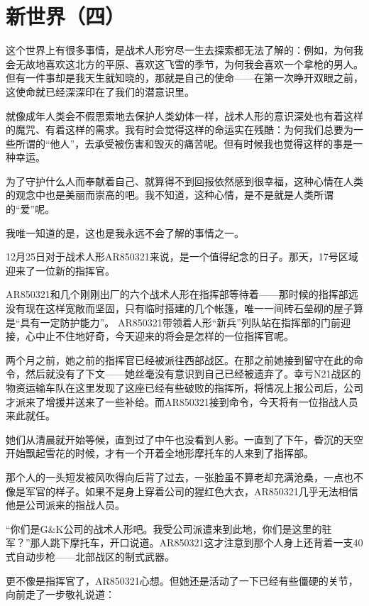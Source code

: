\chapter{新世界（四）}

\begin{QuoteEnv}[QBZ95]{}
这个世界上有很多事情，是战术人形穷尽一生去探索都无法了解的：例如，为何我会无故地喜欢这北方的平原、喜欢这飞雪的季节，为何我会喜欢一个拿枪的男人。但有一件事却是我天生就知晓的，那就是自己的使命——在第一次睁开双眼之前，这使命就已经深深印在了我们的潜意识里。

就像成年人类会不假思索地去保护人类幼体一样，战术人形的意识深处也有着这样的魔咒、有着这样的需求。我有时会觉得这样的命运实在残酷：为何我们总要为一些所谓的“他人”，去承受被伤害和毁灭的痛苦呢。但有时候我也觉得这样的事是一种幸运。

为了守护什么人而奉献着自己、就算得不到回报依然感到很幸福，这种心情在人类的观念中也是美丽而崇高的吧。我不知道，这种心情，是不是就是人类所谓的“爱”呢。

我唯一知道的是，这也是我永远不会了解的事情之一。
\end{QuoteEnv}


12月25日对于战术人形AR850321来说，是一个值得纪念的日子。那天，17号区域迎来了一位新的指挥官。

AR850321和几个刚刚出厂的六个战术人形在指挥部等待着——那时候的指挥部远没有现在这样宽敞而坚固，只有临时搭建的几个帐篷，唯一一间砖石垒砌的屋子算是“具有一定防护能力”。 AR850321带领着人形“新兵”列队站在指挥部的门前迎接，心中止不住地好奇，今天迎来的将会是怎样的一位指挥官呢。

两个月之前，她之前的指挥官已经被派往西部战区。在那之前她接到留守在此的命令，然后就没有了下文——她丝毫没有意识到自己已经被遗弃了。幸亏N21战区的物资运输车队在这里发现了这座已经有些破败的指挥所，将情况上报公司后，公司才派来了增援并送来了一些补给。而AR850321接到命令，今天将有一位指战人员来此就任。

她们从清晨就开始等候，直到过了中午也没看到人影。一直到了下午，昏沉的天空开始飘起雪花的时候，才有一个开着全地形摩托车的人来到了指挥部。

那个人的一头短发被风吹得向后背了过去，一张脸虽不算老却充满沧桑，一点也不像是军官的样子。如果不是身上穿着公司的猩红色大衣，AR850321几乎无法相信他是公司派来的指战人员。

“你们是G\&K公司的战术人形吧。我受公司派遣来到此地，你们是这里的驻军？”那人跳下摩托车，开口说道。AR850321这才注意到那个人身上还背着一支40式自动步枪——北部战区的制式武器。

更不像是指挥官了，AR850321心想。但她还是活动了一下已经有些僵硬的关节，向前走了一步敬礼说道：

